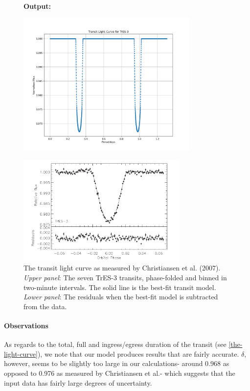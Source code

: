 \documentclass[11pt]{article}
\newcommand*{\figuretitle}[1]{
    	{\textbf{#1}
    	\par\vspace{-1em}}
    }
\begin{document}
    
\begin{figure}
	\figuretitle{Output:}
	\centering
	\includegraphics[width=0.8\textwidth]{../matplotlib_graphs/transit_2.png}
\end{figure} 

\begin{figure}
	\centering
	\includegraphics[width=0.75\textwidth]{../images/TrE-S_light_curve.png}
	\caption{The transit light curve as measured by Christiansen et al. (2007). {\it Upper panel}: The seven TrES-3 transits, phase-folded and binned in two-minute intervals. The solid line is the best-fit transit model. {\it Lower panel}: The residuals when the best-fit model is subtracted from the data.} 
	\label{Figure 4.c}
\end{figure}


    \hypertarget{observations}{%
\paragraph{Observations}\label{observations_3}}

As regards to the total, full and ingress/egress duration of the transit
(see \ref{the-light-curve}), we note that our model produces results that are fairly
accurate. \(\delta\), however, seems to be slightly too large in our
calculations- around 0.968 as opposed to 0.976 as measured by
Christiansen et al.- which suggests that the input data has fairly large degrees of uncertainty.
\end{document}
